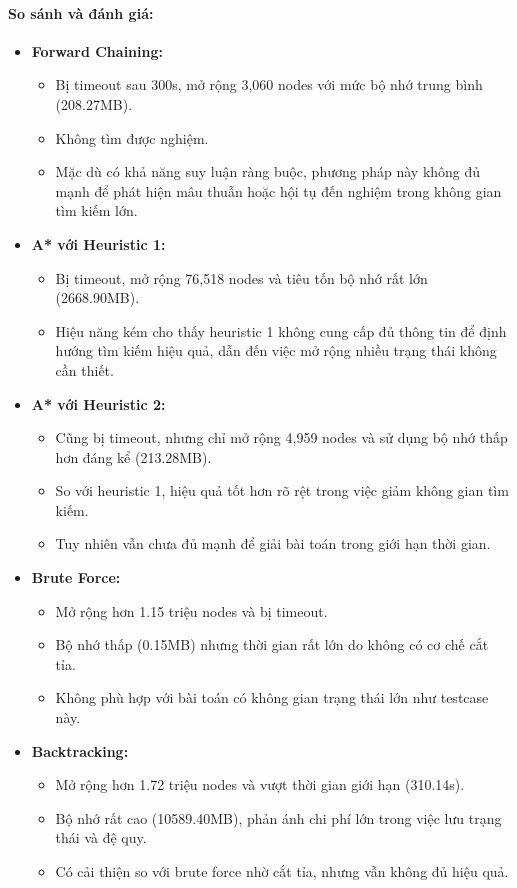 \paragraph{So sánh và đánh giá:}
\begin{itemize}
\item \textbf{Forward Chaining:}
\begin{itemize}
    \item Bị timeout sau 300s, mở rộng 3,060 nodes với mức bộ nhớ trung bình (208.27MB).
    \item Không tìm được nghiệm.
    \item Mặc dù có khả năng suy luận ràng buộc, phương pháp này không đủ mạnh để phát hiện mâu thuẫn hoặc hội tụ đến nghiệm trong không gian tìm kiếm lớn.
\end{itemize}

\item \textbf{A* với Heuristic 1:}
\begin{itemize}
    \item Bị timeout, mở rộng 76,518 nodes và tiêu tốn bộ nhớ rất lớn (2668.90MB).
    \item Hiệu năng kém cho thấy heuristic 1 không cung cấp đủ thông tin để định hướng tìm kiếm hiệu quả, dẫn đến việc mở rộng nhiều trạng thái không cần thiết.
\end{itemize}

\item \textbf{A* với Heuristic 2:}
\begin{itemize}
    \item Cũng bị timeout, nhưng chỉ mở rộng 4,959 nodes và sử dụng bộ nhớ thấp hơn đáng kể (213.28MB).
    \item So với heuristic 1, hiệu quả tốt hơn rõ rệt trong việc giảm không gian tìm kiếm.
    \item Tuy nhiên vẫn chưa đủ mạnh để giải bài toán trong giới hạn thời gian.
\end{itemize}

\item \textbf{Brute Force:}
\begin{itemize}
    \item Mở rộng hơn 1.15 triệu nodes và bị timeout.
    \item Bộ nhớ thấp (0.15MB) nhưng thời gian rất lớn do không có cơ chế cắt tỉa.
    \item Không phù hợp với bài toán có không gian trạng thái lớn như testcase này.
\end{itemize}

\item \textbf{Backtracking:}
\begin{itemize}
    \item Mở rộng hơn 1.72 triệu nodes và vượt thời gian giới hạn (310.14s).
    \item Bộ nhớ rất cao (10589.40MB), phản ánh chi phí lớn trong việc lưu trạng thái và đệ quy.
    \item Có cải thiện so với brute force nhờ cắt tỉa, nhưng vẫn không đủ hiệu quả.
\end{itemize}

\end{itemize}

